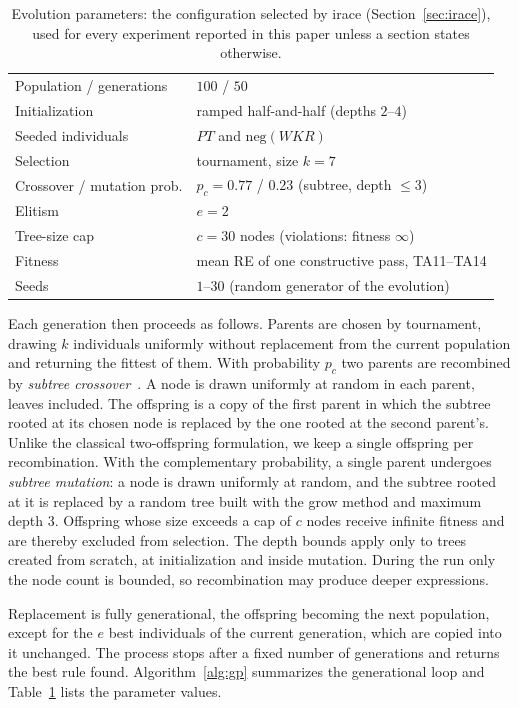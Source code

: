 \documentclass[preprint,number,sort&compress,12pt]{elsarticle}
\begin{document}
\begin{table}[t]
\centering\small
\caption{Evolution parameters: the configuration selected by irace
(Section~\ref{sec:irace}), used for every experiment reported in this
paper unless a section states otherwise.}
\label{tab:gpparams}
\begin{tabular}{ll}
\toprule
Population / generations & $100$ / $50$ \\
Initialization & ramped half-and-half (depths $2$--$4$) \\
Seeded individuals & $\mathit{PT}$ and $\mathrm{neg}(\mathit{WKR})$ \\
Selection & tournament, size $k = 7$ \\
Crossover / mutation prob. & $p_c = 0.77$ / $0.23$ (subtree, depth $\le 3$) \\
Elitism & $e = 2$ \\
Tree-size cap & $c = 30$ nodes (violations: fitness $\infty$) \\
Fitness & mean RE of one constructive pass, TA11--TA14 \\
Seeds & $1$--$30$ (random generator of the evolution) \\
\bottomrule
\end{tabular}
\end{table}

Each generation then proceeds as follows. Parents are chosen by
tournament, drawing $k$ individuals uniformly without replacement from
the current population and returning the fittest of them. With
probability $p_c$ two parents are recombined by \emph{subtree
crossover}~\citep{Koza1992,Poli2008}. A node is drawn uniformly at
random in each parent, leaves included. The offspring is a copy of the
first parent in which the subtree rooted at its chosen node is replaced
by the one rooted at the second parent's. Unlike the classical
two-offspring formulation, we keep a single offspring per recombination.
With the complementary probability, a single parent undergoes
\emph{subtree mutation}: a node is drawn uniformly at random, and the
subtree rooted at it is replaced by a random tree built with the grow
method and maximum depth $3$. Offspring whose size exceeds a cap of $c$
nodes receive infinite fitness and are thereby excluded from selection.
The depth bounds apply only to trees created from scratch, at
initialization and inside mutation. During the run only the node count
is bounded, so recombination may produce deeper expressions.

Replacement is fully generational, the offspring becoming the next
population, except for the $e$ best individuals of the current
generation, which are copied into it unchanged. The process stops after
a fixed number of generations and returns the best rule found.
Algorithm~\ref{alg:gp} summarizes the generational loop and
Table~\ref{tab:gpparams} lists the parameter values.
\end{document}
